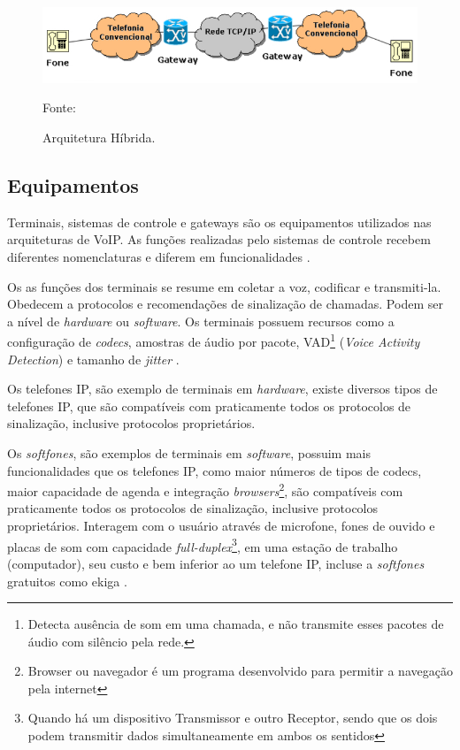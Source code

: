 \begin{figure}[h]
	\centering
	\includegraphics[width=15.0cm]{imagens/hibrida.jpg}
	\caption{Arquitetura Híbrida.}
    \label{Figura11}
    Fonte: \cite{eduardomaronasmonks2006}
\end{figure}

\subsection{Equipamentos}
Terminais, sistemas de controle e gateways são os equipamentos utilizados nas arquiteturas de VoIP. As funções realizadas pelo sistemas de controle recebem diferentes nomenclaturas e diferem em funcionalidades \cite{theodorewallingford2005}.

Os as funções dos terminais se resume em coletar a voz, codificar e transmiti-la. Obedecem a protocolos e recomendações de sinalização de chamadas. Podem ser a nível de \textit{hardware} ou \textit{software}. Os terminais possuem recursos como a configuração de \textit{codecs}, amostras de áudio por pacote, VAD\footnote{Detecta ausência de som em uma chamada, e não transmite esses pacotes de áudio com silêncio pela rede.} (\textit{Voice Activity Detection}) e tamanho de \textit{jitter} \cite{davidson2008}.

Os telefones IP, são exemplo de terminais em \textit{hardware}, existe diversos tipos de telefones IP, que são compatíveis com praticamente todos os protocolos de sinalização, inclusive protocolos proprietários.

Os \textit{softfones}, são exemplos de terminais em \textit{software}, possuim mais funcionalidades que os telefones IP, como maior números de tipos de codecs, maior capacidade de agenda e integração \textit{browsers}\footnote{Browser ou navegador é um programa desenvolvido para permitir a navegação pela internet}, são compatíveis com praticamente todos os protocolos de sinalização, inclusive protocolos proprietários. Interagem com o usuário através de microfone, fones de ouvido e placas de som com capacidade \textit{full-duplex}\footnote{Quando há um dispositivo Transmissor e outro Receptor, sendo que os dois podem transmitir dados simultaneamente em ambos os sentidos}, em uma estação de trabalho (computador), seu custo e bem inferior ao um telefone IP, incluse a \textit{softfones} gratuitos como ekiga \cite{glauciadasilvaribeiro2011}.

